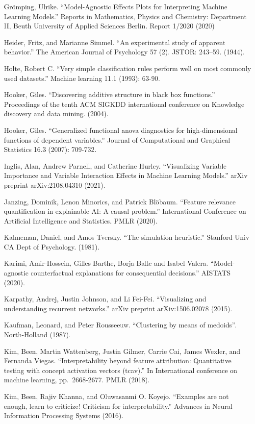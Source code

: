 \documentclass[
  10pt,
]{scrbook}
\begin{document}
Grömping, Ulrike. ``Model-Agnostic Effects Plots for Interpreting Machine Learning Models.'' Reports in Mathematics, Physics and Chemistry: Department II, Beuth University of Applied Sciences Berlin. Report 1/2020 (2020)

Heider, Fritz, and Marianne Simmel. ``An experimental study of apparent behavior.'' The American Journal of Psychology 57 (2). JSTOR: 243--59. (1944).

Holte, Robert C. ``Very simple classification rules perform well on most commonly used datasets.'' Machine learning 11.1 (1993): 63-90.

Hooker, Giles. ``Discovering additive structure in black box functions.'' Proceedings of the tenth ACM SIGKDD international conference on Knowledge discovery and data mining. (2004).

Hooker, Giles. ``Generalized functional anova diagnostics for high-dimensional functions of dependent variables.'' Journal of Computational and Graphical Statistics 16.3 (2007): 709-732.

Inglis, Alan, Andrew Parnell, and Catherine Hurley. ``Visualizing Variable Importance and Variable Interaction Effects in Machine Learning Models.'' arXiv preprint arXiv:2108.04310 (2021).

Janzing, Dominik, Lenon Minorics, and Patrick Blöbaum. ``Feature relevance quantification in explainable AI: A causal problem.'' International Conference on Artificial Intelligence and Statistics. PMLR (2020).

Kahneman, Daniel, and Amos Tversky. ``The simulation heuristic.'' Stanford Univ CA Dept of Psychology. (1981).

Karimi, Amir-Hossein, Gilles Barthe, Borja Balle and Isabel Valera. ``Model-agnostic counterfactual explanations for consequential decisions.'' AISTATS (2020).

Karpathy, Andrej, Justin Johnson, and Li Fei-Fei. ``Visualizing and understanding recurrent networks.'' arXiv preprint arXiv:1506.02078 (2015).

Kaufman, Leonard, and Peter Rousseeuw. ``Clustering by means of medoids''. North-Holland (1987).

Kim, Been, Martin Wattenberg, Justin Gilmer, Carrie Cai, James Wexler, and Fernanda Viegas. ``Interpretability beyond feature attribution: Quantitative testing with concept activation vectors (tcav).'' In International conference on machine learning, pp.~2668-2677. PMLR (2018).

Kim, Been, Rajiv Khanna, and Oluwasanmi O. Koyejo. ``Examples are not enough, learn to criticize! Criticism for interpretability.'' Advances in Neural Information Processing Systems (2016).
\end{document}
